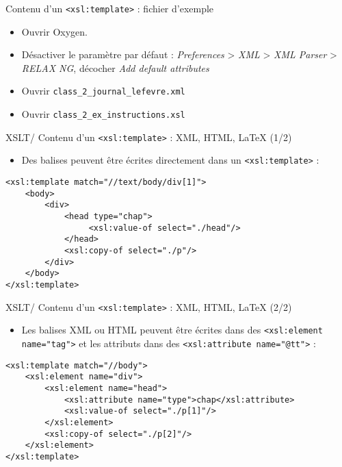 \documentclass{beamer}
\begin{document}
     \begin{frame}{Contenu d'un \texttt{<xsl:template>} : fichier d'exemple}
         \Large
         \begin{itemize}
            \item Ouvrir Oxygen.
            \item Désactiver le paramètre par défaut : \textit{Preferences} > \textit{XML} > \textit{XML Parser} > \textit{RELAX NG}, décocher \textit{Add default attributes}  %
            \bigskip
             \item Ouvrir \texttt{class\_2\_journal\_lefevre.xml}
             \item Ouvrir \texttt{class\_2\_ex\_instructions.xsl}
         \end{itemize}
     \end{frame}

     \begin{frame}[fragile]{XSLT/ Contenu d'un \texttt{<xsl:template>} : XML, HTML, \LaTeX{} (1/2)}
     \Large
        \begin{itemize}
            \item Des balises peuvent être écrites directement dans un \texttt{<xsl:template>} :
        \end{itemize}
        \normalsize
         \begin{verbatim}
<xsl:template match="//text/body/div[1]">
    <body>
        <div>
            <head type="chap">
                 <xsl:value-of select="./head"/>
            </head>
            <xsl:copy-of select="./p"/>
        </div>
    </body>
</xsl:template>
         \end{verbatim}
     \end{frame}

     \begin{frame}[fragile]{XSLT/ Contenu d'un \texttt{<xsl:template>} : XML, HTML, \LaTeX{} (2/2)}
     \Large
        \begin{itemize}
            \item Les balises XML ou HTML peuvent être écrites dans des \texttt{<xsl:element name="tag">} et les attributs dans des \texttt{<xsl:attribute name="@tt">} :
        \end{itemize}
        \normalsize
         \begin{verbatim}
<xsl:template match="//body">
    <xsl:element name="div">
        <xsl:element name="head">
            <xsl:attribute name="type">chap</xsl:attribute>
            <xsl:value-of select="./p[1]"/>
        </xsl:element>
        <xsl:copy-of select="./p[2]"/>
    </xsl:element>
</xsl:template>
         \end{verbatim}
     \end{frame}
\end{document}
